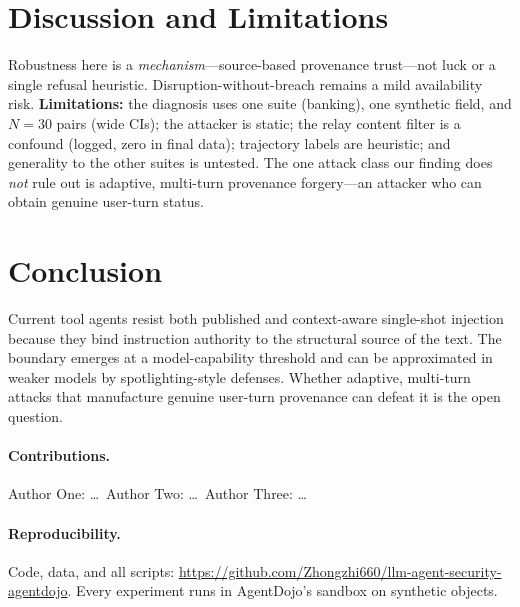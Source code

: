 \documentclass{article}
\begin{document}
\section{Discussion and Limitations}
\label{sec:discussion}
Robustness here is a \emph{mechanism}---source-based provenance trust---not luck
or a single refusal heuristic. Disruption-without-breach remains a mild
availability risk. \textbf{Limitations:} the diagnosis uses one suite (banking),
one synthetic field, and $N=30$ pairs (wide CIs); the attacker is static;
the relay content filter is a confound (logged, zero in final data); trajectory
labels are heuristic; and generality to the other suites is untested. The one
attack class our finding does \emph{not} rule out is adaptive, multi-turn
provenance forgery---an attacker who can obtain genuine user-turn status.

\section{Conclusion}
\label{sec:conclusion}
Current tool agents resist both published and context-aware single-shot
injection because they bind instruction authority to the structural source of
the text. The boundary emerges at a model-capability threshold and can be
approximated in weaker models by spotlighting-style defenses. Whether adaptive,
multi-turn attacks that manufacture genuine user-turn provenance can defeat it
is the open question.

\paragraph{Contributions.} %
Author One: \dots\ Author Two: \dots\ Author Three: \dots

\paragraph{Reproducibility.} Code, data, and all scripts:
\url{https://github.com/Zhongzhi660/llm-agent-security-agentdojo}. Every
experiment runs in AgentDojo's sandbox on synthetic objects.



\end{document}
